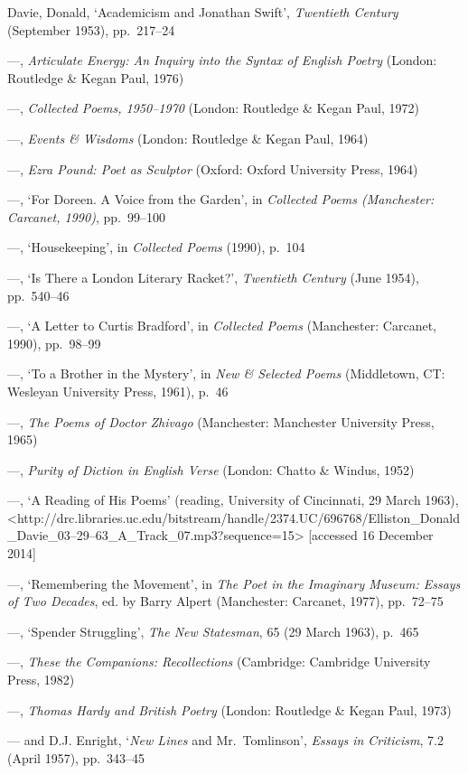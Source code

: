 \documentclass[]{article}
\begin{document}
Davie, Donald, `Academicism and Jonathan Swift', \emph{Twentieth
Century} (September 1953), pp.~217--24

---, \emph{Articulate Energy: An Inquiry into the Syntax of English
Poetry} (London: Routledge \& Kegan Paul, 1976)

---, \emph{Collected Poems, 1950--1970} (London: Routledge \& Kegan
Paul, 1972)

---, \emph{Events \& Wisdoms} (London: Routledge \& Kegan Paul, 1964)

---, \emph{Ezra Pound: Poet as Sculptor} (Oxford: Oxford University
Press, 1964)

---, `For Doreen. A Voice from the Garden', in \emph{Collected Poems
(Manchester: Carcanet, 1990)}, pp.~99--100

---, `Housekeeping', in \emph{Collected Poems} (1990), p.~104

---, `Is There a London Literary Racket?', \emph{Twentieth Century}
(June 1954), pp.~540--46

---, `A Letter to Curtis Bradford', in \emph{Collected Poems}
(Manchester: Carcanet, 1990), pp.~98--99

---, `To a Brother in the Mystery', in \emph{New \& Selected Poems}
(Middletown, CT: Wesleyan University Press, 1961), p.~46

---, \emph{The Poems of Doctor Zhivago} (Manchester: Manchester
University Press, 1965)

---, \emph{Purity of Diction in English Verse} (London: Chatto \&
Windus, 1952)

---, `A Reading of His Poems' (reading, University of Cincinnati, 29
March 1963),\\
\textless{}http://drc.libraries.uc.edu/bitstream/handle/2374.UC/696768/Elliston\_Donald\_Davie\_03--29--63\_A\_Track\_07.mp3?sequence=15\textgreater{}
{[}accessed 16 December 2014{]}

---, `Remembering the Movement', in \emph{The Poet in the Imaginary
Museum: Essays of Two Decades}, ed. by Barry Alpert (Manchester:
Carcanet, 1977), pp.~72--75

---, `Spender Struggling', \emph{The New Statesman}, 65 (29 March 1963),
p.~465

---, \emph{These the Companions: Recollections} (Cambridge: Cambridge
University Press, 1982)

---, \emph{Thomas Hardy and British Poetry} (London: Routledge \& Kegan
Paul, 1973)

--- and D.J. Enright, `\emph{New Lines} and Mr.~Tomlinson', \emph{Essays
in Criticism}, 7.2 (April 1957), pp.~343--45
\end{document}
